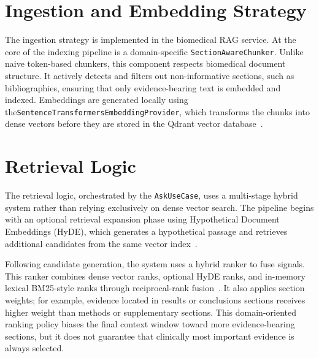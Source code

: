 \section{Ingestion and Embedding Strategy}

The ingestion strategy is implemented in the biomedical RAG service. At the core of the indexing pipeline is a domain-specific \texttt{SectionAwareChunker}. Unlike naive token-based chunkers, this component respects biomedical document structure. It actively detects and filters out non-informative sections, such as bibliographies, ensuring that only evidence-bearing text is embedded and indexed. Embeddings are generated locally using the\linebreak\texttt{SentenceTransformersEmbeddingProvider}, which transforms the chunks into dense vectors before they are stored in the Qdrant vector database~\cite{reimers2019sentencebert,qdrant2026collections}.

\section{Retrieval Logic}

The retrieval logic, orchestrated by the \texttt{AskUseCase}, uses a multi-stage hybrid system rather than relying exclusively on dense vector search. The pipeline begins with an optional retrieval expansion phase using Hypothetical Document Embeddings (HyDE), which generates a hypothetical passage and retrieves additional candidates from the same vector index~\cite{gao2023hyde}.

Following candidate generation, the system uses a hybrid ranker to fuse signals. This ranker combines dense vector ranks, optional HyDE ranks, and in-memory lexical BM25-style ranks through reciprocal-rank fusion~\cite{cormack2009reciprocal}. It also applies section weights; for example, evidence located in results or conclusions sections receives higher weight than methods or supplementary sections. This domain-oriented ranking policy biases the final context window toward more evidence-bearing sections, but it does not guarantee that clinically most important evidence is always selected.

